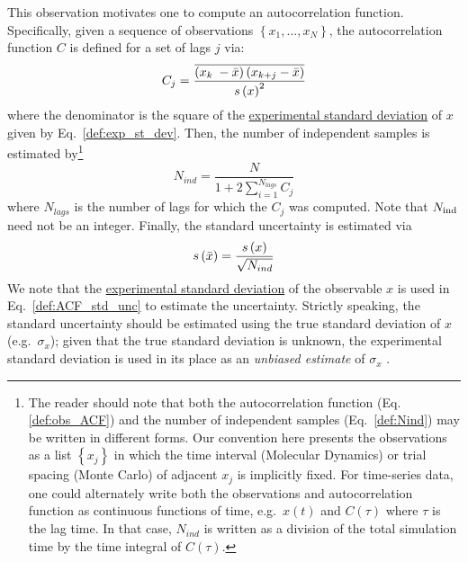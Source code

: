 This observation motivates one to compute an autocorrelation function.  Specifically, given a sequence of observations $\left\{x_1, ..., x_N\right\}$, the autocorrelation function $C$ is defined for a set of lags $j$ via:
%
\begin{equation}
  C_j = \dfrac{
   \overline{
      \left( x_{k{\color{white}j}}\hspace{-1pt} - \mean{x} \right)
      \left( x_{k+j} - \mean{x} \right)
    }
  }
  {\stdev{x}^2}
  \label{def:obs_ACF}
\end{equation}
%
where the denominator is the square of the \hyperref[def:exp_st_dev]{experimental standard deviation} of $x$ given by Eq.~\ref{def:exp_st_dev}.
Then, the number of independent samples is estimated by\footnote{The reader should note that both the autocorrelation function (Eq. \ref{def:obs_ACF}) and the number of independent samples (Eq.~\ref{def:Nind}) may be written in different forms\cite{Grossfield2009,Chodera-2016}. Our convention here presents the observations as a list $\left\{x_j\right\}$ in which the time interval (Molecular Dynamics) or trial spacing (Monte Carlo) of adjacent $x_j$ is implicitly fixed. For time-series data, one could alternately write both the observations and autocorrelation function as continuous functions of time, e.g.~$x\left(t\right)$ and $C\left(\tau\right)$ where $\tau$ is the lag time. In that case, $N_{ind}$ is written as a division of the total simulation time by the time integral of $C\left(\tau\right)$\cite{Grossfield2009}.}
%
\begin{equation}
  N_{ind} = \dfrac{N}{1+2 \sum_{i=1}^{N_{lags}} C_j}
  \label{def:Nind}
\end{equation}
%
where $N_{lags}$ is the number of lags for which the $C_j$ was computed.  Note that $N_{\rm ind}$ need not be an integer.
Finally, the standard uncertainty is estimated via
%
\begin{equation}
  s\left( \bar{x} \right) = \dfrac{s\left( x \right)}{\sqrt{N_{ind}}}
  \label{def:ACF_std_unc}
\end{equation}
%
We note that the \hyperref[def:exp_st_dev]{experimental standard deviation} of the observable $x$ is used in Eq.~\ref{def:ACF_std_unc} to estimate the uncertainty. Strictly speaking, the standard uncertainty should be estimated using the true standard deviation of $x$ (e.g.\ $\sigma_x$); given that the true standard deviation is unknown, the experimental standard deviation is used in its place as an {\it unbiased estimate} of $\sigma_x$ \cite{PatroneAIAA}.


